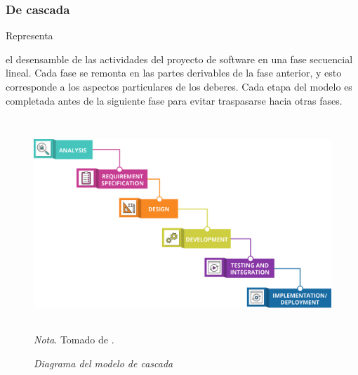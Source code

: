 \documentclass[stu, 12pt, letterpaper, donotrepeattitle, floatsintext, natbib]{apa7}
\begin{document}
\subsubsection{De cascada}
Representa \begin{justifying}
    el desensamble de las actividades del proyecto de software en una fase secuencial lineal. Cada fase se remonta en las partes derivables de la fase anterior, y esto corresponde a los aspectos
    particulares de los deberes. Cada etapa del modelo es completada antes de la siguiente fase para evitar traspasarse hacia otras fases.\par
\end{justifying}
\begin{figure}[H]
    \caption{\emph{Diagrama del modelo de cascada\\}}
    \centering
    \smallskip
    \includegraphics[width=12cm, height=8cm]{waterfall.png}
    \bigskip
    \justifying\small\textit{Nota}. Tomado de \cite{waddell-2021}.%
\end{figure}
\vspace{\baselineskip}
\end{document}

